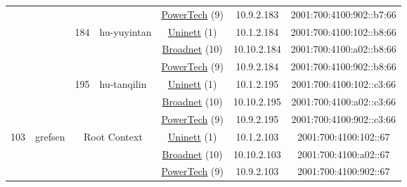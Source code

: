 \begin{small}
\begin{center}
\begin{longtable}{|c|c|c|c|c|c|c|c|}
  &  &  &  & \multicolumn{2}{|c|}{\tiny{\href{http://www.powertech.no}{PowerTech} (9)}} & \tiny{10.9.2.183} & \tiny{2001:700:4100:902::b7:66} \\* \cline{3-3}\cline{4-4}\cline{5-5}\cline{6-6}\cline{7-7}\cline{8-8}
  &  & \multirow{3}{*}{\tiny{184}} & \multicolumn{1}{|l|}{\multirow{3}{*}{\tiny{hu-yuyintan}}} & \multicolumn{2}{|c|}{\tiny{\href{https://www.uninett.no}{Uninett} (1)}} & \tiny{10.1.2.184} & \tiny{2001:700:4100:102::b8:66} \\* \cline{5-5}\cline{6-6}\cline{7-7}\cline{8-8}
  &  &  &  & \multicolumn{2}{|c|}{\tiny{\href{https://www.broadnet.no}{Broadnet} (10)}} & \tiny{10.10.2.184} & \tiny{2001:700:4100:a02::b8:66} \\* \cline{5-5}\cline{6-6}\cline{7-7}\cline{8-8}
  &  &  &  & \multicolumn{2}{|c|}{\tiny{\href{http://www.powertech.no}{PowerTech} (9)}} & \tiny{10.9.2.184} & \tiny{2001:700:4100:902::b8:66} \\* \cline{3-3}\cline{4-4}\cline{5-5}\cline{6-6}\cline{7-7}\cline{8-8}
  &  & \multirow{3}{*}{\tiny{195}} & \multicolumn{1}{|l|}{\multirow{3}{*}{\tiny{hu-tanqilin}}} & \multicolumn{2}{|c|}{\tiny{\href{https://www.uninett.no}{Uninett} (1)}} & \tiny{10.1.2.195} & \tiny{2001:700:4100:102::c3:66} \\* \cline{5-5}\cline{6-6}\cline{7-7}\cline{8-8}
  &  &  &  & \multicolumn{2}{|c|}{\tiny{\href{https://www.broadnet.no}{Broadnet} (10)}} & \tiny{10.10.2.195} & \tiny{2001:700:4100:a02::c3:66} \\* \cline{5-5}\cline{6-6}\cline{7-7}\cline{8-8}
  &  &  &  & \multicolumn{2}{|c|}{\tiny{\href{http://www.powertech.no}{PowerTech} (9)}} & \tiny{10.9.2.195} & \tiny{2001:700:4100:902::c3:66} \\ \hline
 \multirow{33}{*}{\tiny{103}} & \multicolumn{1}{|l|}{\multirow{33}{*}{\tiny{grefsen}}} & \multicolumn{2}{|c|}{\multirow{3}{*}{\tiny{Root Context}}} & \multicolumn{2}{|c|}{\tiny{\href{https://www.uninett.no}{Uninett} (1)}} & \tiny{10.1.2.103} & \tiny{2001:700:4100:102::67} \\* \cline{5-5}\cline{6-6}\cline{7-7}\cline{8-8}
  &  & \multicolumn{2}{|c|}{} & \multicolumn{2}{|c|}{\tiny{\href{https://www.broadnet.no}{Broadnet} (10)}} & \tiny{10.10.2.103} & \tiny{2001:700:4100:a02::67} \\* \cline{5-5}\cline{6-6}\cline{7-7}\cline{8-8}
  &  & \multicolumn{2}{|c|}{} & \multicolumn{2}{|c|}{\tiny{\href{http://www.powertech.no}{PowerTech} (9)}} & \tiny{10.9.2.103} & \tiny{2001:700:4100:902::67} \\* \cline{3-3}\cline{4-4}\cline{5-5}\cline{6-6}\cline{7-7}\cline{8-8}

\end{longtable}
\end{center}
\end{small}
